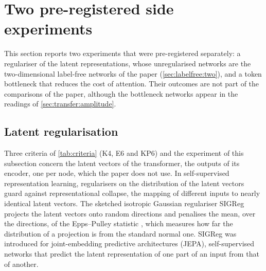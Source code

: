 \section{Two pre-registered side experiments}\label{app:e1}

This section reports two experiments that were pre-registered separately: a regulariser of the
latent representations, whose unregularised networks are the two-dimensional label-free
networks of the paper (\cref{sec:labelfree:two}), and a token bottleneck that reduces the cost
of attention. Their outcomes are not part of the comparisons of the paper, although the
bottleneck networks appear in the readings of \cref{sec:transfer:amplitude}.

\subsection{Latent regularisation}\label{app:e1:latent}

Three criteria of \cref{tab:criteria} (K4, E6 and KP6) and the experiment of this
subsection concern the latent vectors of the transformer, the outputs of its encoder, one
per node, which the paper does not use. In self-supervised representation learning,
regularisers on the distribution of the latent vectors guard against representational
collapse, the mapping of different inputs to nearly identical latent vectors. The
sketched isotropic Gaussian regulariser SIGReg \cite{Balestriero2025LeJEPA} projects the
latent vectors onto random directions and penalises the mean, over the directions, of the
Epps--Pulley statistic \cite{EppsPulley1983}, which measures how far the distribution of a
projection is from the standard normal one. SIGReg was introduced for joint-embedding
predictive architectures (JEPA), self-supervised networks that predict the latent
representation of one part of an input from that of another.

